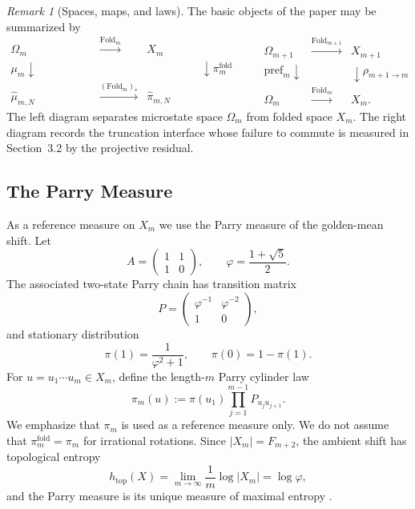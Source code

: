 \documentclass[11pt,letterpaper]{article}
\numberwithin{equation}{section}
\theoremstyle{plain}
\theoremstyle{definition}
\theoremstyle{remark}
\newtheorem{remark}[theorem]{Remark}
\newcommand{\Fold}{\mathrm{Fold}}
\newcommand{\pref}{\mathrm{pref}}
\begin{document}
\begin{remark}[Spaces, maps, and laws]\label{rem:model-spaces-maps}
The basic objects of the paper may be summarized by
\[
\begin{array}{ccc}
\Omega_m & \xrightarrow{\Fold_m} & X_m\\[0.3em]
\mu_m \downarrow\phantom{(\Fold_m)_*} &  & \phantom{(\Fold_m)_*}\downarrow \pi_m^{\mathrm{fold}}\\[0.3em]
\hat\mu_{m,N} & \xrightarrow{(\Fold_m)_*} & \hat\pi_{m,N}
\end{array}
\qquad
\begin{array}{ccc}
\Omega_{m+1} & \xrightarrow{\Fold_{m+1}} & X_{m+1}\\[0.3em]
\pref_m \downarrow &  & \downarrow \rho_{m+1\to m}\\[0.3em]
\Omega_m & \xrightarrow{\Fold_m} & X_m.
\end{array}
\]
The left diagram separates microstate space \(\Omega_m\) from folded space
\(X_m\). The right diagram records the truncation interface whose failure to
commute is measured in Section~3.2 by the projective residual.
\end{remark}

\subsection{The Parry Measure}

As a reference measure on \(X_m\) we use the Parry measure of the golden-mean
shift. Let
\[
A=\begin{pmatrix}1&1\\1&0\end{pmatrix},\qquad
\varphi=\frac{1+\sqrt5}{2}.
\]
The associated two-state Parry chain has transition matrix
\[
P=\begin{pmatrix}\varphi^{-1} & \varphi^{-2}\\ 1&0\end{pmatrix},
\]
and stationary distribution
\[
\pi(1)=\frac{1}{\varphi^2+1},\qquad
\pi(0)=1-\pi(1).
\]
For $u=u_1\cdots u_m\in X_m$, define the length-$m$ Parry cylinder law
\[
\pi_m(u):=\pi(u_1)\prod_{j=1}^{m-1}P_{u_j u_{j+1}}.
\]
We emphasize that \(\pi_m\) is used as a reference measure only. We do not
assume that \(\pi_m^{\mathrm{fold}}=\pi_m\) for irrational rotations.
Since \(|X_m|=F_{m+2}\), the ambient shift has topological entropy
\[
h_{\mathrm{top}}(X)=\lim_{m\to\infty}\frac1m\log |X_m|=\log\varphi,
\]
and the Parry measure is its unique measure of maximal entropy
\cite{LindMarcus1995,WaltersErgodicTheory}.
\end{document}
